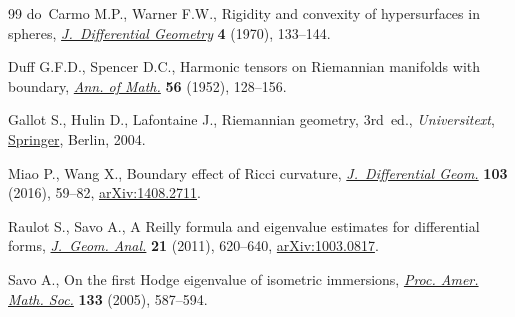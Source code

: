 \documentclass[11pt]{article}
\numberwithin{equation}{section}
\numberwithin{equation}{section}
\begin{document}
\begin{thebibliography}{99}
do~Carmo M.P., Warner F.W., Rigidity and convexity of hypersurfaces in spheres,
  \href{https://doi.org/10.4310/jdg/1214429378}{\textit{J.~Differential Geometry}} \textbf{4} (1970), 133--144.

Duff G.F.D., Spencer D.C., Harmonic tensors on {R}iemannian manifolds with
  boundary, \href{https://doi.org/10.2307/1969771}{\textit{Ann. of Math.}} \textbf{56} (1952), 128--156.

Gallot S., Hulin D., Lafontaine J., Riemannian geometry, 3rd~ed., \textit{Universitext},
  \href{https://doi.org/10.1007/978-3-642-18855-8}{Springer}, Berlin, 2004.

Miao P., Wang X., Boundary effect of {R}icci curvature, \href{http://doi.org/10.4310/jdg/1460463563}{\textit{J.~Differential
  Geom.}} \textbf{103} (2016), 59--82, \href{https://arxiv.org/abs/1408.2711}{arXiv:1408.2711}.

Raulot S., Savo A., A {R}eilly formula and eigenvalue estimates for
  differential forms, \href{https://doi.org/10.1007/s12220-010-9161-0}{\textit{J.~Geom. Anal.}} \textbf{21} (2011), 620--640,
  \href{https://arxiv.org/abs/1003.0817}{arXiv:1003.0817}.

Savo A., On the first {H}odge eigenvalue of isometric immersions, \href{https://doi.org/10.1090/S0002-9939-04-07702-0}{\textit{Proc.
  Amer. Math. Soc.}} \textbf{133} (2005), 587--594.

\end{thebibliography}
\end{document}
